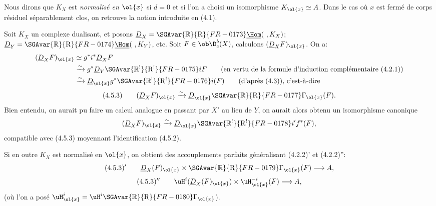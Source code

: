 Nous dirons que $K_X$ est \emph{normalisé en $\ol{x}$} si $d=0$ et si l'on a choisi un isomorphisme $K_{\ol{x}}\simeq A$. Dans le cas où $x$ est fermé de corps résiduel séparablement clos, on retrouve la notion introduite en (4.1).

Soit $K_X$ un complexe dualisant, et posons $\underline{D}_X=\SGAvar{\mathbb{R}}{\mathrm{R}}{FR-0173}\underline{\Hom}(\ ,K_X)$; $\underline{D}_Y=\SGAvar{\mathbb{R}}{\mathrm{R}}{FR-0174}\underline{\Hom}(\ ,K_Y)$, etc. Soit $F\in\ob\D_c^b(X)$, calculons $(\underline{D}_XF)_{\ol{x}}$. On a:
\[
\begin{aligned}
(\underline{D}_XF)_{\ol{x}}&\simeq g^*i^*\underline{D}_X F\\
&\xrightarrow{\sim}g^*\underline{D}_Y\SGAvar{\mathbb{R}^{!}}{\mathrm{R}^{!}}{FR-0175}iF\qquad\text{(en vertu de la formule d'induction complémentaire (4.2.1))}\\
&\xrightarrow{\sim}\underline{D}_{\ol{x}}g^*\SGAvar{\mathbb{R}^{!}}{\mathrm{R}^{!}}{FR-0176}i(F)\qquad\text{(d'après (4.3)), c'est-à-dire}
\end{aligned}
\]
\[
(4.5.3)\qquad (\underline{D}_X F)_{\ol{x}}\xrightarrow{\sim}\underline{D}_{\ol{x}}\SGAvar{\mathbb{R}}{\mathrm{R}}{FR-0177}\Gamma_{\ol{x}}(F).
\]
Bien entendu, on aurait pu faire un calcul analogue en passant par 
$X'$ au
lieu de $Y$, on aurait alors obtenu un isomorphisme canonique
\[
(\underline{D}_XF)_{\ol{x}}\xrightarrow{\sim}\underline{D}_{\ol{x}}\SGAvar{\mathbb{R}^{!}}{\mathrm{R}^{!}}{FR-0178}i'f^*(F),
\]
compatible avec (4.5.3) moyennant l'identification (4.5.2).

Si en outre $K_X$ est normalisé en $\ol{x}$, on obtient des accouplements parfaits généralisant (4.2.2)' et (4.2.2)'':
\[
(4.5.3)'\qquad \underline{D}_X(F)_{\ol{x}}\times \SGAvar{\mathbb{R}}{\mathrm{R}}{FR-0179}\Gamma_{\ol{x}}(F)\longrightarrow A,
\]
\[
(4.5.3)''\qquad \uH^i(\underline{D}_X(F)_{\ol{x}})\times \uH_{\ol{x}}^{-i}(F)\longrightarrow A,
\]
(où l'on a posé $\uH_{\ol{x}}^i=\uH^i\SGAvar{\mathbb{R}}{\mathrm{R}}{FR-0180}\Gamma_{\ol{x}}$).

